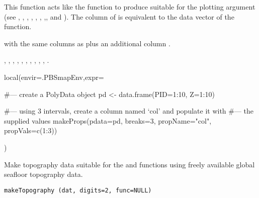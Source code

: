 \documentclass[letterpaper]{book}
\begin{document}
%
\begin{Details}\relax
This function acts like the  function to produce
 suitable for the  plotting argument
(see , ,
, ,
, ,
,, and
).  The  column of  is
equivalent to the data vector  of the 
function.
\end{Details}
%
\begin{Value}
 with the same columns as  plus an
additional column .
\end{Value}
%
\begin{SeeAlso}\relax
{},
,
,
,
,
,
,
,
,
,
.
\end{SeeAlso}
%
\begin{Examples}
\begin{ExampleCode}
local(envir=.PBSmapEnv,expr={
  #--- create a PolyData object
  pd <- data.frame(PID=1:10, Z=1:10)

  #--- using 3 intervals, create a column named `col' and populate it with
  #--- the supplied values
  makeProps(pdata=pd, breaks=3, propName="col", propVals=c(1:3))
})
\end{ExampleCode}
\end{Examples}
%
\begin{Description}\relax
Make topography data suitable for the  and
 functions using freely available global
seafloor topography data.
\end{Description}
%
\begin{Usage}
\begin{verbatim}
makeTopography (dat, digits=2, func=NULL)
\end{verbatim}
\end{Usage}
\end{document}
